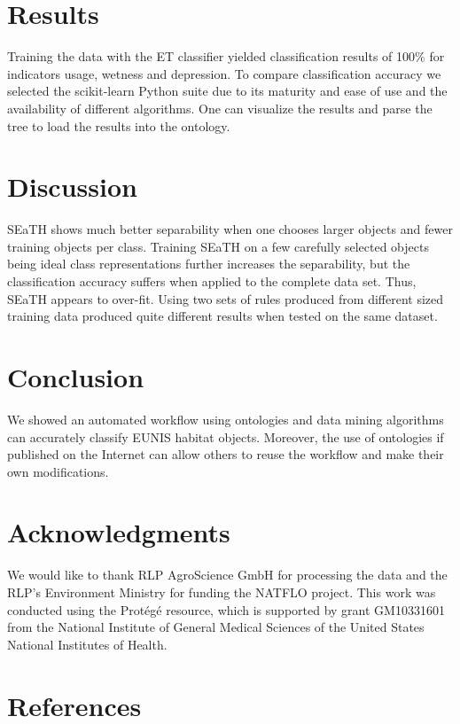 \documentclass[authoryear, review,12pt,number]{elsarticle}
\begin{document}
\section{Results}
Training the data with the ET classifier yielded classification results of
100\% for indicators usage, wetness and depression.
To compare classification accuracy we selected the scikit-learn Python suite
\citep{scikit-learn} due to its maturity and ease of use and the availability of
different algorithms. One can visualize the results and parse the tree to load
the results into the ontology.
\section{Discussion} SEaTH shows much better separability when one chooses
larger objects and fewer training objects per class. Training SEaTH on a few
carefully selected objects being ideal class representations further increases
the separability, but the classification accuracy suffers when applied to the
complete data set. Thus, SEaTH appears to over-fit. Using two sets of rules
produced from different sized training data produced quite different results
when tested on the same dataset.
\section{Conclusion} We showed an automated
workflow using ontologies and data mining algorithms can accurately classify
EUNIS habitat objects. Moreover, the use of ontologies if published on the
Internet can allow others to reuse the workflow and make their own
modifications. 
\section{Acknowledgments}
We would like to thank RLP AgroScience GmbH for processing the data and the
RLP's Environment Ministry for funding the NATFLO project. This work was
conducted using the Prot\'eg\'e resource, which is supported by grant GM10331601
from the National Institute of General Medical Sciences of the United States
National
Institutes of Health.

\section{References}  
\end{document}
